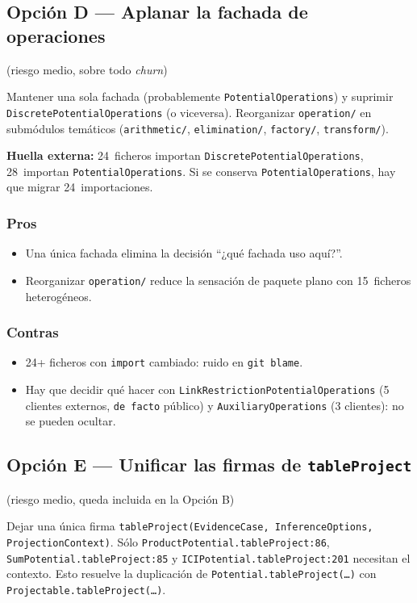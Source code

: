 \documentclass[11pt,a4paper]{article}
\newcommand{\code}[1]{\texttt{#1}}
\begin{document}
\subsection{Opción D --- Aplanar la fachada de operaciones}
(riesgo medio, sobre todo \emph{churn})

Mantener una sola fachada (probablemente \code{PotentialOperations}) y
suprimir \code{DiscretePotentialOperations} (o viceversa). Reorganizar
\code{operation/} en submódulos temáticos (\code{arithmetic/},
\code{elimination/}, \code{factory/}, \code{transform/}).

\textbf{Huella externa:} 24~ficheros importan
\code{DiscretePotentialOperations}, 28~importan \code{PotentialOperations}.
Si se conserva \code{PotentialOperations}, hay que migrar 24~importaciones.

\subsubsection*{Pros}
\begin{itemize}[leftmargin=*]
  \item Una única fachada elimina la decisión ``¿qué fachada uso aquí?''.
  \item Reorganizar \code{operation/} reduce la sensación de paquete plano
        con 15~ficheros heterogéneos.
\end{itemize}

\subsubsection*{Contras}
\begin{itemize}[leftmargin=*]
  \item 24+ ficheros con \code{import} cambiado: ruido en \code{git blame}.
  \item Hay que decidir qué hacer con
        \code{LinkRestrictionPotentialOperations} (5 clientes externos,
        \code{de facto} público) y \code{AuxiliaryOperations} (3 clientes):
        no se pueden ocultar.
\end{itemize}

\subsection{Opción E --- Unificar las firmas de \code{tableProject}}
(riesgo medio, queda incluida en la Opción B)

Dejar una única firma \code{tableProject(EvidenceCase, InferenceOptions, ProjectionContext)}.
Sólo \code{ProductPotential.tableProject:86},
\code{SumPotential.tableProject:85} y \code{ICIPotential.tableProject:201}
necesitan el contexto. Esto resuelve la duplicación de
\code{Potential.tableProject(\dots)} con \code{Projectable.tableProject(\dots)}.
\end{document}
